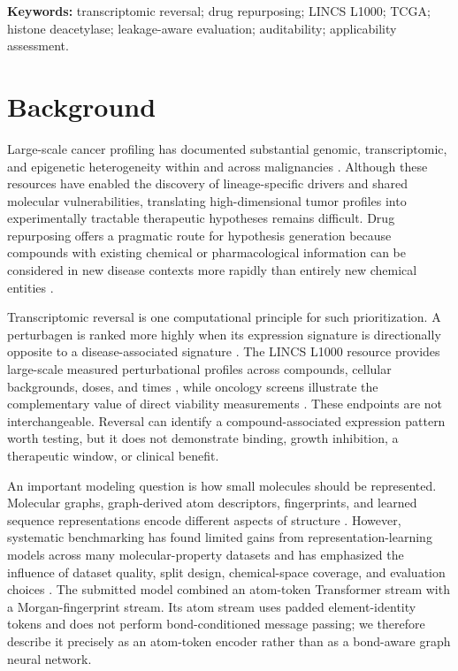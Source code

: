 \begin{roundtworevision}
\noindent\textbf{Keywords:} transcriptomic reversal; drug repurposing; LINCS L1000; TCGA; histone deacetylase; leakage-aware evaluation; auditability; applicability assessment.\par
\end{roundtworevision}
\vspace{1em}

\section{Background}

\begin{minorrevision}
Large-scale cancer profiling has documented substantial genomic, transcriptomic, and epigenetic heterogeneity within and across malignancies \cite{weinstein2013,rodriguez2020,martinez2023}. Although these resources have enabled the discovery of lineage-specific drivers and shared molecular vulnerabilities, translating high-dimensional tumor profiles into experimentally tractable therapeutic hypotheses remains difficult. Drug repurposing offers a pragmatic route for hypothesis generation because compounds with existing chemical or pharmacological information can be considered in new disease contexts more rapidly than entirely new chemical entities \cite{pushpakom2019,nosengo2016}.

Transcriptomic reversal is one computational principle for such prioritization. A perturbagen is ranked more highly when its expression signature is directionally opposite to a disease-associated signature \cite{chen2017}. The LINCS L1000 resource provides large-scale measured perturbational profiles across compounds, cellular backgrounds, doses, and times \cite{subramanian2017}, while oncology screens illustrate the complementary value of direct viability measurements \cite{corsello2020}. These endpoints are not interchangeable. Reversal can identify a compound-associated expression pattern worth testing, but it does not demonstrate binding, growth inhibition, a therapeutic window, or clinical benefit.\par
\end{minorrevision}

\begin{roundtworevision}
An important modeling question is how small molecules should be represented. Molecular graphs, graph-derived atom descriptors, fingerprints, and learned sequence representations encode different aspects of structure \cite{gilmer2017,kipf2017,velickovic2018,wu2018,yang2019,honda2019}. However, systematic benchmarking has found limited gains from representation-learning models across many molecular-property datasets and has emphasized the influence of dataset quality, split design, chemical-space coverage, and evaluation choices \cite{deng2023systematic}. The submitted model combined an atom-token Transformer stream with a Morgan-fingerprint stream. Its atom stream uses padded element-identity tokens and does not perform bond-conditioned message passing; we therefore describe it precisely as an atom-token encoder rather than as a bond-aware graph neural network.
\end{roundtworevision}

